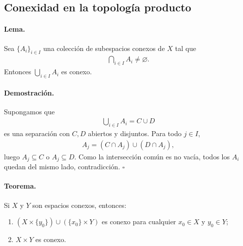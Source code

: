
\subsection{Conexidad en la topología producto}

\paragraph{\textbf{Lema.}}
Sea $\{A_i\}_{i\in I}$ una colección de subespacios conexos de $X$ tal que
\begin{align*}
\bigcap_{i\in I}A_i\neq\varnothing .
\end{align*}
Entonces $\displaystyle\bigcup_{i\in I}A_i$ es conexo.

\paragraph{\textbf{Demostración.}}
Supongamos que
\begin{align*}
\bigcup_{i\in I}A_i=C\cup D
\end{align*}
es una separación con $C,D$ abiertos y disjuntos.  
Para todo $j\in I$,
\begin{align*}
A_j=(C\cap A_j)\cup(D\cap A_j),
\end{align*}
luego $A_j\subseteq C$ o $A_j\subseteq D$.  
Como la intersección común es no vacía, todos los $A_i$ quedan del mismo lado, contradicción. \hfill$\square$

\paragraph{\textbf{Teorema.}}
Si $X$ y $Y$ son espacios conexos, entonces:
\begin{enumerate}
  \item $(X\times\{y_0\})\cup(\{x_0\}\times Y)$ es conexo para cualquier $x_0\in X$ y $y_0\in Y$;
  \item $X\times Y$ es conexo.
\end{enumerate}


